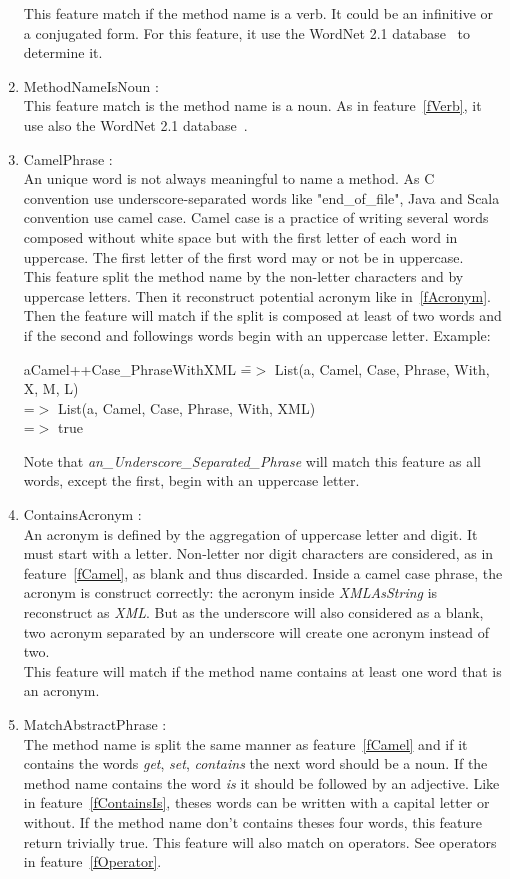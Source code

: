 \documentclass[12pt]{article}
\newcommand{\code}[1]{{\fontfamily{phv}\selectfont \small{\begin{tabbing} #1 \end{tabbing}}}}
\begin{document}
\begin{enumerate}
	This feature match if the method name is a verb. It could be an infinitive or a conjugated form. For this feature, it use the WordNet 2.1 database~\cite{wordNet} to determine it.
\item MethodNameIsNoun :\\
	This feature match is the method name is a noun. As in feature~\ref{fVerb}, it use also the WordNet 2.1 database~\cite{wordNet}.
\item CamelPhrase : \label{fCamel}\\
	An unique word is not always meaningful to name a method. As C convention use underscore-separated words like "end\_of\_file", Java and Scala convention use camel case. Camel case is a practice of writing several words composed without white space but with the first letter of each word in uppercase. The first letter of the first word may or not be in uppercase.\\
This feature split the method name by the non-letter characters and by uppercase letters. Then it reconstruct potential acronym like in~\ref{fAcronym}. Then the feature will match if the split is composed at least of two words and if the second and followings words begin with an uppercase letter. Example:
\code{aCamel++Case\_PhraseWithXML \= =$>$ List(a, Camel, Case, Phrase, With, X, M, L)\\
\>=$>$ List(a, Camel, Case, Phrase, With, XML)\\
\>=$>$ true
}
Note that \textit{an\_Underscore\_Separated\_Phrase} will match this feature as all words, except the first, begin with an uppercase letter.
\item ContainsAcronym :\label{fAcronym}\\
	An acronym is defined by the aggregation of uppercase letter and digit. It must start with a letter. Non-letter nor digit characters are considered, as in feature~\ref{fCamel}, as blank and thus discarded. Inside a camel case phrase, the acronym is construct correctly: the acronym inside \textit{XMLAsString} is reconstruct as \textit{XML}. But as the underscore will also considered as a blank, two acronym separated by an underscore will create one acronym instead of two.\\
This feature will match if the method name contains at least one word that is an acronym.
\item MatchAbstractPhrase :\label{fAbstractPhrase} \\
	The method name is split the same manner as feature~\ref{fCamel} and if it contains the words \textit{get}, \textit{set}, \textit{contains} the next word should be a noun. If the method name contains the word \textit{is} it should be followed by an adjective. Like in feature~\ref{fContainsIs}, theses words can be written with a capital letter or without. If the method name don't contains theses four words, this feature return trivially true. This feature will also match on operators. See operators in feature~\ref{fOperator}.

\end{enumerate}
\end{document}
